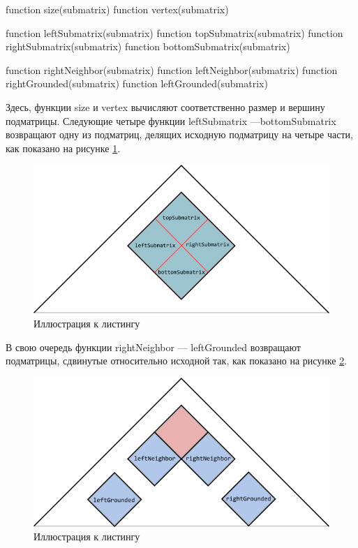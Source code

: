 \documentclass[12pt]{article}  %
\theoremstyle{definition}
\theoremstyle{remark}
\begin{document}
\begin{algorithm}[caption={Submatrix helpers.}, label={helpers}]
function size(submatrix)
function vertex(submatrix)

function leftSubmatrix(submatrix)
function topSubmatrix(submatrix)
function rightSubmatrix(submatrix)
function bottomSubmatrix(submatrix)

function rightNeighbor(submatrix)
function leftNeighbor(submatrix)
function rightGrounded(submatrix)
function leftGrounded(submatrix)     
\end{algorithm}

Здесь, функции size и vertex вычисляют соответственно размер и вершину подматрицы. Следующие четыре функции leftSubmatrix ---\linebreak bottomSubmatrix возвращают одну из подматриц, делящих исходную подматрицу на четыре части, как показано на рисунке \ref{gr:inner}.


\begin{figure}[!ht]
  \caption{Иллюстрация к листингу}
  \label{gr:inner}
  \centering
    \includegraphics[width=0.9\linewidth]{inner.png}
\end{figure}

\pagebreak

В свою очередь функции rightNeighbor --- leftGrounded возвращают подматрицы, сдвинутые относительно исходной так, как показано на рисунке \ref{gr:outer}.

\begin{figure}[!ht]
  \caption{Иллюстрация к листингу}
  \label{gr:outer}
  \centering
    \includegraphics[width=0.9\linewidth]{outer.png}
\end{figure}
\end{document}

